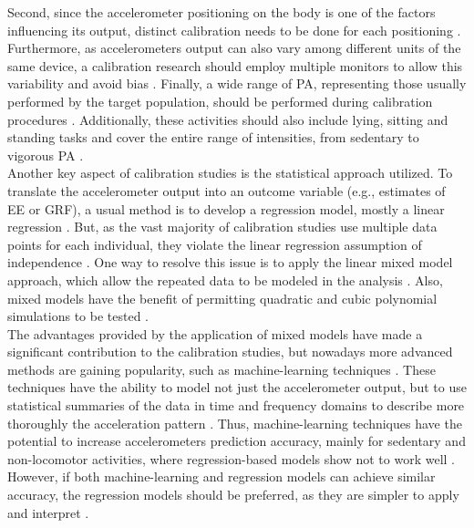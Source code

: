 \documentclass[11pt]{article}
\begin{document}
Second, since the accelerometer positioning on the body is one of the factors influencing its output, distinct calibration needs to be done for each positioning \cite{Welk_2005}. Furthermore, as accelerometers output can also vary among different units of the same device, a calibration research should employ multiple monitors to allow this variability and avoid bias \cite{Welk_2005}. Finally, a wide range of PA, representing those usually performed by the target population, should be performed during calibration procedures \cite{Welk_2005, Basset_2012}. Additionally, these activities should also include lying, sitting and standing tasks and cover the entire range of intensities, from sedentary to vigorous PA \cite{Basset_2012}. \\

Another key aspect of calibration studies is the statistical approach utilized. To translate the accelerometer output into an outcome variable (e.g., estimates of EE or GRF), a usual method is to develop a regression model, mostly a linear regression \cite{Montoye_2017}. But, as the vast majority of calibration studies use multiple data points for each individual, they violate the linear regression assumption of independence \cite{Welk_2005, Field_2012}. One way to resolve this issue is to apply the linear mixed model approach, which allow the repeated data to be modeled in the analysis \cite{Field_2012}. Also, mixed models have the benefit of permitting quadratic and cubic polynomial simulations to be tested \cite{Field_2012}. \\

The advantages provided by the application of mixed models have made a significant contribution to the calibration studies, but nowadays more advanced methods are gaining popularity, such as machine-learning techniques \cite{Montoye_2017, Troiano_2014}. These techniques have the ability to model not just the accelerometer output, but to use statistical summaries of the data in time and frequency domains to describe more thoroughly the acceleration pattern \cite{Staudenmayer_2015, Farrahi_2019}. Thus, machine-learning techniques have the potential to increase accelerometers prediction accuracy, mainly for sedentary and non-locomotor activities, where regression-based models show not to work well \cite{Montoye_2017}. However, if both machine-learning and regression models can achieve similar accuracy, the regression models should be preferred, as they are simpler to apply and interpret \cite{Montoye_2017}. \\
\end{document}

